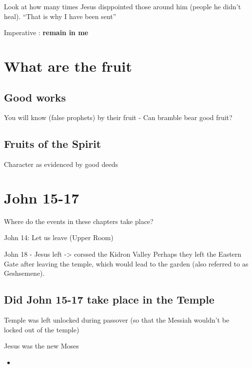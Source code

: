 \documentclass[
]{book}
\providecommand{\tightlist}{%
  \setlength{\itemsep}{0pt}\setlength{\parskip}{0pt}}
\begin{document}
Look at how many times Jesus disppointed those around him (people he didn't heal). ``That is why I have been sent''

Imperative : \textbf{remain in me}

\hypertarget{what-are-the-fruit}{%
\section{What are the fruit}\label{what-are-the-fruit}}

\hypertarget{good-works}{%
\subsection{Good works}\label{good-works}}

You will know (false prophets) by their fruit - Can bramble bear good fruit?

\hypertarget{fruits-of-the-spirit}{%
\subsection{Fruits of the Spirit}\label{fruits-of-the-spirit}}

Character as evidenced by good deeds

\hypertarget{john-15-17}{%
\section{John 15-17}\label{john-15-17}}

Where do the events in these chapters take place?

John 14: Let us leave (Upper Room)

John 18 - Jesus left -\textgreater{} corssed the Kidron Valley
Perhaps they left the Eastern Gate after leaving the temple, which would lead to the garden (also referred to as Geshsemene).

\hypertarget{did-john-15-17-take-place-in-the-temple}{%
\subsection{Did John 15-17 take place in the Temple}\label{did-john-15-17-take-place-in-the-temple}}

Temple was left unlocked during passover (so that the Messiah wouldn't be locked out of the temple)

Jesus was the new Moses

\begin{itemize}
\tightlist
\item
\end{itemize}
\end{document}
